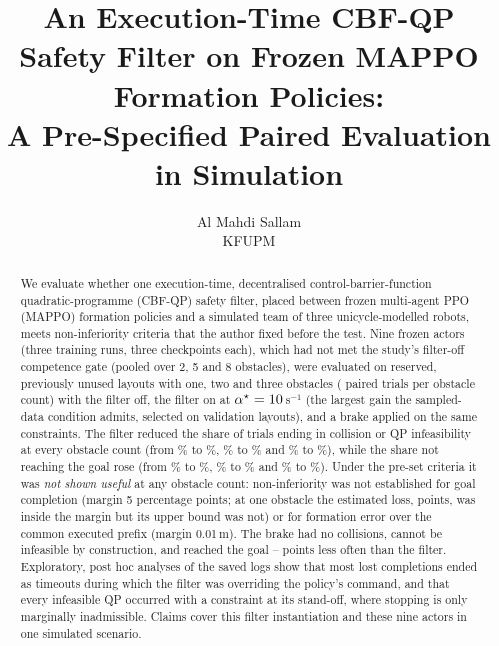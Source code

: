 \documentclass[11pt]{article}
\title{An Execution-Time CBF-QP Safety Filter on Frozen MAPPO Formation Policies:\\
A Pre-Specified Paired Evaluation in Simulation}
\author{Al Mahdi Sallam\\KFUPM}
\date{}
\begin{document}
\maketitle

\begin{abstract}
We evaluate whether one execution-time, decentralised control-barrier-function quadratic-programme
(CBF-QP) safety filter, placed between frozen multi-agent PPO (MAPPO) formation policies and a
simulated team of three unicycle-modelled robots, meets non-inferiority criteria that the author fixed
before the test. Nine frozen actors (three training runs, three checkpoints each), which had not met
the study's filter-off competence gate (pooled over 2, 5 and 8 obstacles), were evaluated on reserved, previously unused layouts with
one, two and three obstacles (\PairsPerDensity{} paired trials per obstacle count) with the filter off,
the filter on at $\alpha^\star=10$\,s$^{-1}$ (the largest gain the sampled-data condition
admits, selected on validation layouts), and a brake applied on the same constraints. The filter
reduced the share of trials ending in collision or QP infeasibility at every obstacle count (from
\FailOffone\% to \FailOnone\%, \FailOfftwo\% to \FailOntwo\% and \FailOffthree\% to \FailOnthree\%),
while the share not reaching the goal rose (from \NonGoalOffone\% to \NonGoalOnone\%,
\NonGoalOfftwo\% to \NonGoalOntwo\% and \NonGoalOffthree\% to \NonGoalOnthree\%). Under the pre-set
criteria it was \emph{not shown useful} at any obstacle count: non-inferiority was not established for
goal completion (margin 5 percentage points; at one obstacle the estimated loss, \Blossone{} points, was
inside the margin but its upper bound was not) or for formation error over the common executed prefix
(margin 0.01\,m). The brake had no collisions, cannot be infeasible by construction, and reached the
goal \OnBmGoalMin--\OnBmGoalMax{} points less often than the filter. Exploratory, post hoc analyses of
the saved logs show that most lost completions ended as timeouts during which the filter was overriding
the policy's command, and that every infeasible QP occurred with a constraint at its stand-off, where
stopping is only marginally inadmissible. Claims cover this filter instantiation and these nine actors
in one simulated scenario.
\end{abstract}
\end{document}
